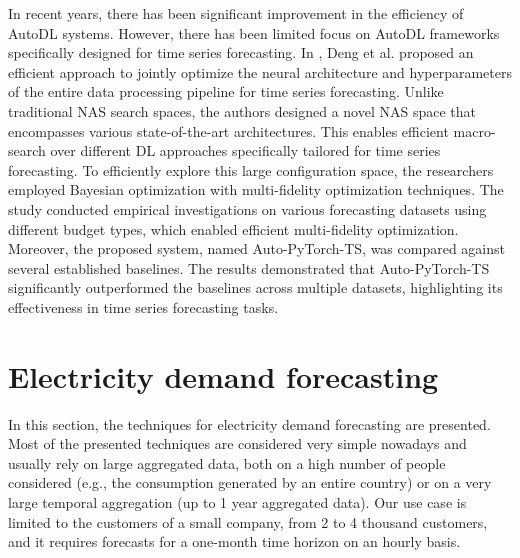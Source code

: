In recent years, there has been significant improvement in the efficiency of AutoDL systems.
However, there has been limited focus on AutoDL frameworks specifically designed for time series forecasting.
In \cite{Deng2022}, Deng et al. proposed an efficient approach to jointly optimize the neural architecture and hyperparameters of the entire data processing pipeline for time series forecasting.
Unlike traditional NAS search spaces, the authors designed a novel NAS space that encompasses various state-of-the-art architectures.
This enables efficient macro-search over different DL approaches specifically tailored for time series forecasting.
To efficiently explore this large configuration space, the researchers employed Bayesian optimization with multi-fidelity optimization techniques.
The study conducted empirical investigations on various forecasting datasets using different budget types, which enabled efficient multi-fidelity optimization.
Moreover, the proposed system, named Auto-PyTorch-TS, was compared against several established baselines.
The results demonstrated that Auto-PyTorch-TS significantly outperformed the baselines across multiple datasets, highlighting its effectiveness in time series forecasting tasks.


\section{Electricity demand forecasting}
\label{sec:demandsoa}
\vspace{0.2 cm}

In this section, the techniques for electricity demand forecasting are presented.
Most of the presented techniques are considered very simple nowadays and usually rely on large aggregated data, both on a high number of people considered (e.g., the consumption generated by an entire country) or on a very large temporal aggregation (up to 1 year aggregated data).
Our use case is limited to the customers of a small company, from 2 to 4 thousand customers, and it requires forecasts for a one-month time horizon on an hourly basis.

